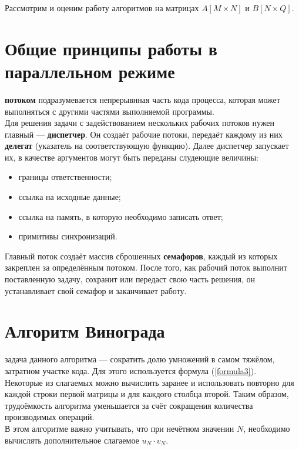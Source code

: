 Рассмотрим и оценим работу алгоритмов на матрицах $A[M \times N]$ и $B[N \times Q]$. 

\section{Общие принципы работы в параллельном режиме}
 \textbf{потоком} подразумевается непрерывнная часть кода процесса, которая может выполняться с другими частями выполняемой программы.\\

Для решения задачи с задействованием нескольких рабочих потоков нужен главный --- \textbf{диспетчер}. Он создаёт рабочие потоки, передаёт каждому из них \textbf{делегат} (указатель на соответствующую функцию). Далее диспетчер запускает их, в качестве аргументов могут быть переданы слудеющие величины:
\begin{itemize}
	\item границы ответственности;
	\item ссылка на исходные данные;
	\item ссылка на память, в которую необходимо записать ответ;
	\item примитивы синхронизаций.
\end{itemize}

Главный поток создаёт массив сброшенных \textbf{семафоров}, каждый из которых закреплен за определённым потоком. После того, как рабочий поток выполнит поставленную задачу, сохранит или передаст свою часть решения, он устанавливает свой семафор и заканчивает работу.

\section{Алгоритм Винограда}
 задача данного алгоритма --- сократить долю умножений в самом тяжёлом, затратном участке кода. Для этого используется формула (\ref{formula3}).\\

Некоторые из слагаемых можно вычислить заранее и использовать повторно для каждой строки первой матрицы и для каждого столбца второй. Таким образом, трудоёмкость алгоритма уменьшается за счёт сокращения количества производимых операций.\\

В этом алгоритме важно учитывать, что при нечётном значении $N$, необходимо вычислять дополнительное слагаемое $u_N \cdot v_N$.\\

